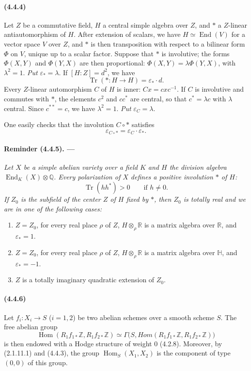 \documentclass[10pt]{article}
\newcommand{\Q}{\mathbb Q}
\newcommand{\Z}{\mathbb Z}
\newcommand{\Hom}{\operatorname{Hom}}
\newcommand{\R}{\mathbb R}
\providecommand{\End}{\operatorname{End}}
\newcommand{\Tr}{\operatorname{Tr}}
\begin{document}
\paragraph{(4.4.4)} Let $Z$ be a commutative field, $H$ a central simple algebra over $Z$, and $*$ a $Z$-linear antiautomorphism of $H$. After extension of scalars, we have $H\simeq\End(V)$ for a vector space $V$ over $Z$, and $*$ is then transposition with respect to a bilinear form $\Phi$ on $V$, unique up to a scalar factor. Suppose that $*$ is involutive; the forms $\Phi(X,Y)$ and $\Phi(Y,X)$ are then proportional: $\Phi(X,Y)=\lambda\Phi(Y,X)$, with $\lambda^2=1$. \emph{Put} $\varepsilon_*=\lambda$. If $[H:Z]=d^2$, we have
\[
\Tr(*:H\to H)=\varepsilon_*\cdot d.
\]
Every $Z$-linear automorphism $C$ of $H$ is inner: $Cx=cxc^{-1}$. If $C$ is involutive and commutes with $*$, the elements $c^2$ and $cc^*$ are central, so that $c^*=\lambda c$ with $\lambda$ central. Since $c^{**}=c$, we have $\lambda^2=1$. \emph{Put} $\varepsilon_C=\lambda$.

One easily checks that the involution $C\circ *$ satisfies
\[
\varepsilon_{C\circ *}=\varepsilon_C\cdot\varepsilon_*.
\]

\paragraph{Reminder (4.4.5). ---} {\itshape Let $X$ be a simple abelian variety over a field $K$ and $H$ the division algebra $\End_K(X)\otimes\Q$. Every polarization of $X$ defines a positive involution $*$ of $H$:
\[
\Tr(hh^*)>0\qquad\text{if }h\ne0.
\]
If $Z_0$ is the subfield of the center $Z$ of $H$ fixed by $*$, then $Z_0$ is totally real and we are in one of the following cases:
\begin{enumerate}[label=\alph*)]
\item $Z=Z_0$, for every real place $\rho$ of $Z$, $H\otimes_\rho\R$ is a matrix algebra over $\R$, and $\varepsilon_*=1$.
\item $Z=Z_0$, for every real place $\rho$ of $Z$, $H\otimes_\rho\R$ is a matrix algebra over $\mathbb H$, and $\varepsilon_*= -1$.
\item $Z$ is a totally imaginary quadratic extension of $Z_0$.
\end{enumerate}}

\paragraph{(4.4.6)} Let $f_i:X_i\to S$ ($i=1,2$) be two abelian schemes over a smooth scheme $S$. The free abelian group
\[
\Hom(R_1f_{1*}\Z,R_1f_{2*}\Z)
 \simeq\Gamma\bigl(S,\mathit{Hom}(R_1f_{1*}\Z,R_1f_{2*}\Z)\bigr)
\]
is then endowed with a Hodge structure of weight $0$ (4.2.8). Moreover, by (2.1.11.1) and (4.4.3), the group $\Hom_S(X_1,X_2)$ is the component of type $(0,0)$ of this group.
\end{document}
